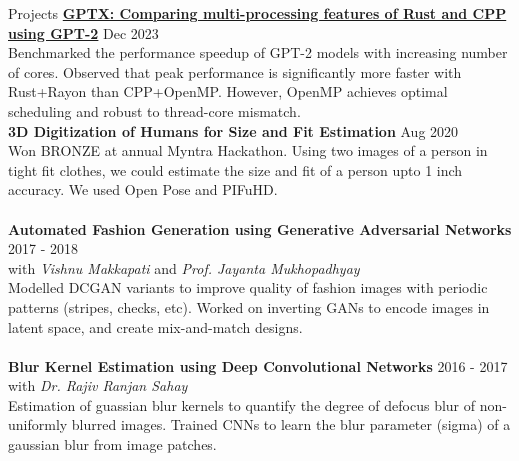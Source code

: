 \documentclass{resume} %
\begin{document}
\begin{rSection}{Projects}
{\bf \href{https://arunpatro.github.io/blog/gptx/}{GPTX: Comparing multi-processing features of Rust and CPP using GPT-2} } \hfill {Dec 2023}
\\Benchmarked the performance speedup of GPT-2 models with increasing number of cores. Observed that peak performance is significantly more faster with Rust+Rayon than CPP+OpenMP. However, OpenMP achieves optimal scheduling and robust to thread-core mismatch. \\

{\bf 3D Digitization of Humans for Size and Fit Estimation} \hfill {Aug 2020}
\\Won BRONZE at annual Myntra Hackathon. Using two images of a person in tight fit clothes, we could estimate the size and fit of a person upto 1 inch accuracy. We used Open Pose and PIFuHD. \\
\\{\bf Automated Fashion Generation using Generative Adversarial Networks} \hfill {2017 - 2018}
\\with \emph{Vishnu Makkapati} and \emph{Prof. Jayanta Mukhopadhyay} 
\\Modelled DCGAN variants to improve quality of fashion images with periodic patterns (stripes, checks, etc). Worked on inverting GANs to encode images in latent space, and create mix-and-match designs.\\
\\{\bf Blur Kernel Estimation using Deep Convolutional Networks} \hfill {2016 - 2017}
\\with \emph{Dr. Rajiv Ranjan Sahay}
\\Estimation of guassian blur kernels to quantify the degree of defocus blur of non-uniformly blurred images. Trained CNNs to learn the blur parameter (sigma) of a gaussian blur from image patches. \\

\end{rSection}
\end{document}
